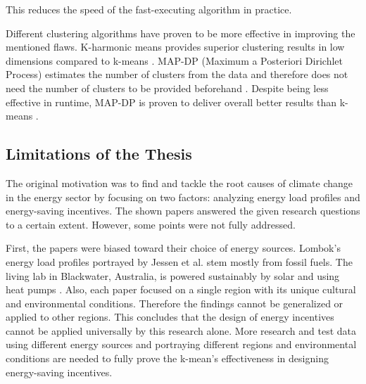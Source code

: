 \begin{description}
    This reduces the speed of the fast-executing algorithm in practice.
    \end{description}
    
Different clustering algorithms have proven to be more effective in improving the mentioned flaws.
K-harmonic means provides superior clustering results in low dimensions compared to k-means \cite{HAM-ALT}.
MAP-DP (Maximum a Posteriori Dirichlet Process) estimates the number of clusters from the data and therefore does not need the number of clusters to be provided beforehand \cite{RAY-ALT}.
Despite being less effective in runtime, MAP-DP is proven to deliver overall better results than k-means \cite{RAY-ALT}.

\subsection{Limitations of the Thesis}
The original motivation was to find and tackle the root causes of climate change in the energy sector by focusing on two factors: analyzing energy load profiles and energy-saving incentives.
The shown papers answered the given research questions to a certain extent.
However, some points were not fully addressed.

First, the papers were biased toward their choice of energy sources.
Lombok's energy load profiles portrayed by Jessen et al. \cite{JES-IND} stem mostly from fossil fuels.
The living lab in Blackwater, Australia, is powered sustainably by solar and using heat pumps \cite{MAL-HBP}.
Also, each paper focused on a single region with its unique cultural and environmental conditions.
Therefore the findings cannot be generalized or applied to other regions.
This concludes that the design of energy incentives cannot be applied universally by this research alone.
More research and test data using different energy sources and portraying different regions and environmental conditions are needed to fully prove the k-mean's effectiveness in designing energy-saving incentives. 


